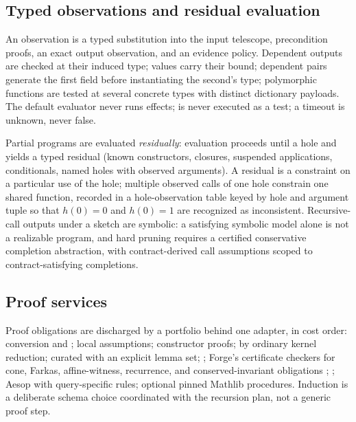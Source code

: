 \subsection{Typed observations and residual evaluation}

An observation is a typed substitution into the input telescope, precondition proofs, an exact output observation, and an evidence policy. Dependent outputs are checked at their induced type;  values carry their bound; dependent pairs generate the first field before instantiating the second's type; polymorphic functions are tested at several concrete types with distinct dictionary payloads. The default evaluator never runs effects;  is never executed as a test; a timeout is unknown, never false.

Partial programs are evaluated \emph{residually}: evaluation proceeds until a hole and yields a typed residual (known constructors, closures, suspended applications, conditionals, named holes with observed arguments). A residual is a constraint on a particular use of the hole; multiple observed calls of one hole constrain one shared function, recorded in a hole-observation table keyed by hole and argument tuple so that $h(0) = 0$ and $h(0) = 1$ are recognized as inconsistent. Recursive-call outputs under a sketch are symbolic: a satisfying symbolic model alone is not a realizable program, and hard pruning requires a certified conservative completion abstraction, with contract-derived call assumptions scoped to contract-satisfying completions.

\subsection{Proof services}\label{sec:proof-services}

Proof obligations are discharged by a portfolio behind one adapter, in cost order: conversion and ; local assumptions; constructor proofs;  by ordinary kernel reduction; curated  with an explicit lemma set; ; Forge's certificate checkers for cone, Farkas, affine-witness, recurrence, and conserved-invariant obligations \cite{forge}; ; Aesop with query-specific rules; optional pinned Mathlib procedures. Induction is a deliberate schema choice coordinated with the recursion plan, not a generic proof step.

